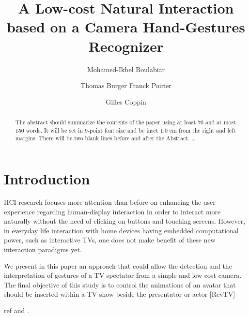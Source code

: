 \documentclass{llncs}
\begin{document}
\frontmatter          %
\pagestyle{headings}  %
\mainmatter              %
%
\title{A Low-cost Natural Interaction based on a Camera Hand-Gestures Recognizer}
\author{Mohamed-Ikbel Boulabiar \and Thomas Burger
Franck Poirier \and Gilles Coppin}
%

\maketitle

\begin{abstract}
The abstract should summarize the contents of the paper
using at least 70 and at most 150 words. It will be set in 9-point
font size and be inset 1.0 cm from the right and left margins.
There will be two blank lines before and after the Abstract. \dots
{}
\end{abstract}
%

\section{Introduction}
HCI research focuses more attention than before on enhancing the user experience regarding human-display interaction in order to interact more naturally without the need of clicking on buttons and touching screens. However, in everyday life interaction with home devices having embedded computational power, such as interactive TVs, one does not make benefit of these new interaction paradigms yet. 

We present in this paper an approach that could allow the detection and the interpretation of gestures of a TV spectator from a simple and low cost camera. 
The final objective of this study is to control the animations of an avatar that should be inserted within a TV show beside the presentator or actor [RevTV]

ref \cite{Gesturecraft} and \cite{skinColorSeg}.
\end{document}
